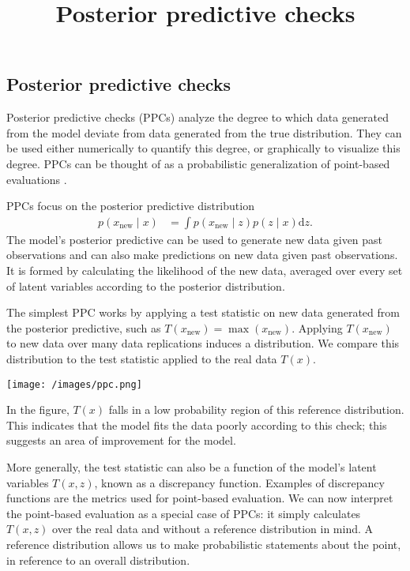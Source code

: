 \title{Posterior predictive checks}

\subsection{Posterior predictive checks}

Posterior predictive checks (PPCs)
analyze the degree to which data generated from the model deviate from
data generated from the true distribution. They can be used either
numerically to quantify this degree, or graphically to visualize this
degree. PPCs can be thought of as a probabilistic generalization of
point-based evaluations
\citep{box1980sampling,rubin1984bayesianly,meng1994posterior,gelman1996posterior}.

PPCs focus on the posterior predictive distribution
\begin{align*}
  p(x_\text{new} \mid x)
  &=
  \int
  p(x_\text{new} \mid z)
  p(z \mid x)
  \text{d} z.
\end{align*}
The model's posterior predictive can be used to generate new data
given past observations and can also make predictions on new data
given past observations.
It is formed by calculating the likelihood of the new data, averaged
over every set of latent variables according to the posterior
distribution.

The simplest PPC works by applying a test statistic on new data
generated from the posterior predictive, such as
$T(x_\text{new}) = \max(x_\text{new})$.  Applying $T(x_\text{new})$ to
new data over many data replications induces a distribution. We compare
this distribution to the test statistic applied to the real data $T(x)$.

\texttt{[image: /images/ppc.png]}

In the figure, $T(x)$ falls in a low probability region of this
reference distribution. This indicates that the model fits the data
poorly according to this check; this suggests an area of improvement
for the model.

More generally, the test statistic can also be a function of the
model's latent variables $T(x, z)$, known as a discrepancy function.
Examples of discrepancy functions are the metrics used for point-based
evaluation. We can now interpret the point-based evaluation as a
special case of PPCs: it simply calculates $T(x, z)$ over the real
data and without a reference distribution in mind. A reference
distribution allows us to make probabilistic statements about the
point, in reference to an overall distribution.

